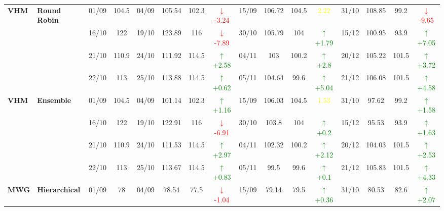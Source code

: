 \documentclass{ieeeaccess}
\begin{document}
{\begin{longtable}{llcc|cccc|cccc|cccc}
\multirow{4}{*}{\textbf{VHM}} 
& \textbf{Round Robin}
& 01/09 & 104.5 & 04/09 & 105.54 & 102.3 & \textcolor{red}{\(\downarrow\)-3.24} & 15/09 & 106.72 & 104.5 & \textcolor{yellow}{2.22} & 31/10 & 108.85 & 99.2 & \textcolor{red}{\(\downarrow\)-9.65} \\

&
& 16/10 & 122 & 19/10 & 123.89 & 116 & \textcolor{red}{\(\downarrow\)-7.89} & 30/10 & 105.79 & 104 & \textcolor{green}{\(\uparrow\)+1.79} & 15/12 & 100.95 & 93.9 & \textcolor{green}{\(\uparrow\)+7.05} \\

&
& 21/10 & 110.9 & 24/10 & 111.92 & 114.5 & \textcolor{green}{\(\uparrow\)+2.58} & 04/11 & 103 & 100.2 & \textcolor{green}{\(\uparrow\)+2.8} & 20/12 & 105.22 & 101.5 & \textcolor{green}{\(\uparrow\)+3.72} \\

&
& 22/10 & 113 & 25/10 & 113.88 & 114.5 & \textcolor{green}{\(\uparrow\)+0.62} & 05/11 & 104.64 & 99.6 & \textcolor{green}{\(\uparrow\)+5.04} & 21/12 & 106.08 & 101.5 & \textcolor{green}{\(\uparrow\)+4.58} \\
\midrule


\multirow{4}{*}{\textbf{VHM}} 
& \textbf{Ensemble}
& 01/09 & 104.5 & 04/09 & 101.14 & 102.3 & \textcolor{green}{\(\uparrow\)+1.16} & 15/09 & 106.03 & 104.5 & \textcolor{yellow}{1.53} & 31/10 & 97.62 & 99.2 & \textcolor{green}{\(\uparrow\)+1.58} \\

&
& 16/10 & 122 & 19/10 & 122.91 & 116 & \textcolor{red}{\(\downarrow\)-6.91} & 30/10 & 103.8 & 104 & \textcolor{green}{\(\uparrow\)+0.2} & 15/12 & 95.53 & 93.9 & \textcolor{green}{\(\uparrow\)+1.63} \\

&
& 21/10 & 110.9 & 24/10 & 111.53 & 114.5 & \textcolor{green}{\(\uparrow\)+2.97} & 04/11 & 102.32 & 100.2 & \textcolor{green}{\(\uparrow\)+2.12} & 20/12 & 104.03 & 101.5 & \textcolor{green}{\(\uparrow\)+2.53} \\

&
& 22/10 & 113 & 25/10 & 113.67 & 114.5 & \textcolor{green}{\(\uparrow\)+0.83} & 05/11 & 99.5 & 99.6 & \textcolor{green}{\(\uparrow\)+0.1} & 21/12 & 105.83 & 101.5 & \textcolor{green}{\(\uparrow\)+4.33} \\
\midrule




\multirow{4}{*}{\textbf{MWG}} 
& \textbf{Hierarchical}
& 01/09 & 78 & 04/09 & 78.54 & 77.5 & \textcolor{red}{\(\downarrow\)-1.04} & 15/09 & 79.14 & 79.5 & \textcolor{green}{\(\uparrow\)+0.36} & 31/10 & 80.53 & 82.6 & \textcolor{green}{\(\uparrow\)+2.07} \\


\end{longtable}}
\end{document}

